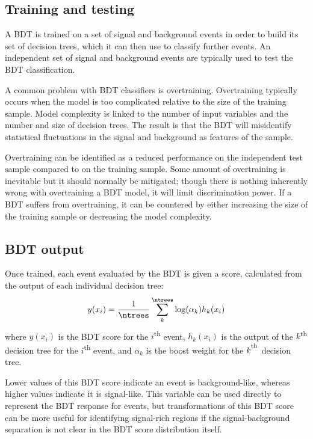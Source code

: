 \subsection{Training and testing}

A \ac{BDT} is trained on a set of signal and background events in order to build
its set of decision trees, which it can then use to classify further events.
An independent set of signal and background events are typically used to test
the \ac{BDT} classification.

A common problem with \ac{BDT} classifiers is overtraining. Overtraining
typically occurs when the model is too complicated relative to the size of the
training sample. Model complexity is linked to the number of input variables and
the number and size of decision trees.
The result is that the \ac{BDT} will misidentify statistical fluctuations
in the signal and background as features of the sample.

Overtraining can be identified as a reduced performance on the independent
test sample compared to on the training sample. Some amount of overtraining is
inevitable but it should normally be mitigated; though there is nothing
inherently wrong with overtraining a \ac{BDT} model, it will limit
discrimination power. If a \ac{BDT} suffers from overtraining, it can be
countered by either increasing the size of the training sample or decreasing the
model complexity.

\subsection{BDT output}
\label{sec:methods-bdt-output}

Once trained, each event evaluated by the \ac{BDT} is given a score,
calculated from the output of each individual decision tree:
\begin{equation*}
  y(x_i) = \frac1{\ntrees} \sum_k^{\ntrees} \log(\alpha_k)h_k(x_i)
\end{equation*}
where $y(x_i)$ is the \ac{BDT} score for the $i$\textsuperscript{th} event,
$h_k(x_i)$ is the output of the $k$\textsuperscript{th} decision tree for the
$i$\textsuperscript{th} event, and $\alpha_k$ is the boost weight for the
$k^\textsuperscript{th}$ decision tree.

Lower values of this \ac{BDT} score indicate an event is background-like,
whereas higher values indicate it is signal-like. This variable can be used
directly to represent the \ac{BDT} response for events, but
transformations of this \ac{BDT} score can be more useful for identifying
signal-rich regions if the signal-background separation is not clear in the
\ac{BDT} score distribution itself.


